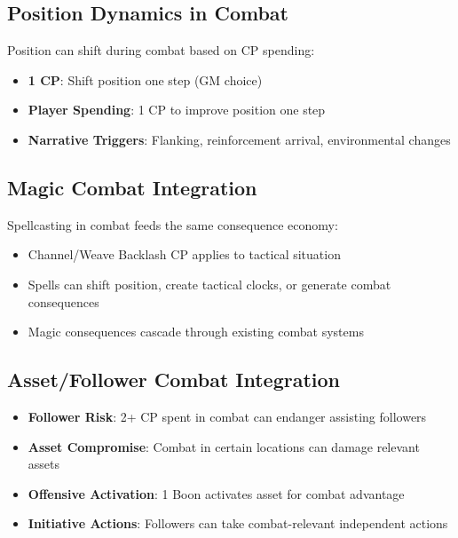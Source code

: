 \subsection*{Position Dynamics in Combat}

Position can shift during combat based on CP spending:

\begin{itemize}
    \item \textbf{1 CP}: Shift position one step (GM choice)
    \item \textbf{Player Spending}: 1 CP to improve position one step
    \item \textbf{Narrative Triggers}: Flanking, reinforcement arrival, environmental changes
\end{itemize}

\subsection*{Magic Combat Integration}

Spellcasting in combat feeds the same consequence economy:

\begin{itemize}
    \item Channel/Weave Backlash CP applies to tactical situation
    \item Spells can shift position, create tactical clocks, or generate combat consequences
    \item Magic consequences cascade through existing combat systems
\end{itemize}

\subsection*{Asset/Follower Combat Integration}

\begin{itemize}
    \item \textbf{Follower Risk}: 2+ CP spent in combat can endanger assisting followers
    \item \textbf{Asset Compromise}: Combat in certain locations can damage relevant assets  
    \item \textbf{Offensive Activation}: 1 Boon activates asset for combat advantage
    \item \textbf{Initiative Actions}: Followers can take combat-relevant independent actions
\end{itemize}


